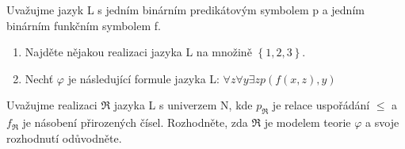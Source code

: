\subsubsection{}
Uvažujme jazyk L s jedním binárním predikátovým symbolem p a jedním binárním
funkčním symbolem f.

\begin{enumerate}
  \item Najděte nějakou realizaci jazyka L na množině $\left \{ 1,2,3 \right
  \}$.
  \item Nechť $\varphi$ je následující formule jazyka L: $\forall z \forall y
  \exists z p(f(x,z),y)$
\end{enumerate}

Uvažujme realizaci $\Re$ jazyka L s univerzem N, kde $p_{\Re}$ je relace
uspořádání $\leq$ a $f_{\Re}$ je násobení přirozených čísel. Rozhodněte, zda
$\Re$ je modelem teorie $\varphi$ a svoje rozhodnutí odůvodněte.
